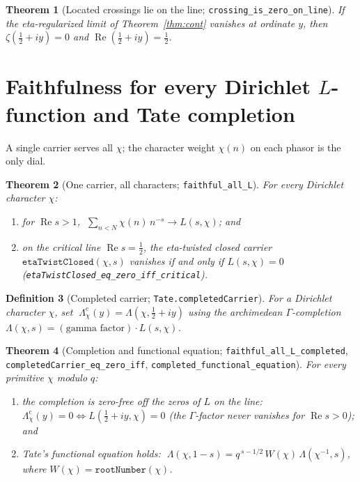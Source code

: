 \documentclass[11pt]{article}
\newtheorem{definition}{Definition}[section]
\newtheorem{theorem}[definition]{Theorem}
\DeclareMathOperator{\Ree}{Re}
\newcommand{\code}[1]{\texttt{#1}}
\begin{document}
\begin{theorem}[Located crossings lie on the line; \code{crossing\_is\_zero\_on\_line}]\label{thm:located}
If the eta-regularized limit of Theorem~\ref{thm:cont} vanishes at ordinate $y$, then
$\zeta(\tfrac12+iy)=0$ and $\Ree(\tfrac12+iy)=\tfrac12$.
\end{theorem}

\section{Faithfulness for every Dirichlet $L$-function and Tate completion}\label{sec:allL}

A single carrier serves all $\chi$; the character weight $\chi(n)$ on each phasor is the only dial.

\begin{theorem}[One carrier, all characters; \code{faithful\_all\_L}]\label{thm:alll}
For every Dirichlet character $\chi$:
\begin{enumerate}[label=\textup{(\roman*)}]
\item for $\Ree s>1$, $\;\sum_{n<N}\chi(n)\,n^{-s}\to L(s,\chi)$; and
\item on the critical line $\Ree s=\tfrac12$, the eta-twisted closed carrier
$\code{etaTwistClosed}(\chi,s)$ vanishes if and only if $L(s,\chi)=0$
(\code{etaTwistClosed\_eq\_zero\_iff\_critical}).
\end{enumerate}
\end{theorem}

\begin{definition}[Completed carrier; \code{Tate.completedCarrier}]\label{def:completed}
For a Dirichlet character $\chi$, set $\;\Lambda_\chi^{\mathrm{c}}(y)=\Lambda(\chi,\tfrac12+iy)$ using
the archimedean $\Gamma$-completion $\Lambda(\chi,s)=(\text{gamma factor})\cdot L(s,\chi)$.
\end{definition}

\begin{theorem}[Completion and functional equation; \code{faithful\_all\_L\_completed}, \code{completedCarrier\_eq\_zero\_iff}, \code{completed\_functional\_equation}]\label{thm:tate}
For every \emph{primitive} $\chi$ modulo $q$:
\begin{enumerate}[label=\textup{(\roman*)}]
\item the completion is zero-free off the zeros of $L$ on the line: $\Lambda_\chi^{\mathrm{c}}(y)=0
\iff L(\tfrac12+iy,\chi)=0$ (the $\Gamma$-factor never vanishes for $\Ree s>0$); and
\item Tate's functional equation \cite{Tate1967} holds:
$\;\Lambda(\chi,1-s)=q^{\,s-1/2}\,W(\chi)\,\Lambda(\chi^{-1},s)$,
where $W(\chi)=\code{rootNumber}(\chi)$.
\end{enumerate}
\end{theorem}
\end{document}
